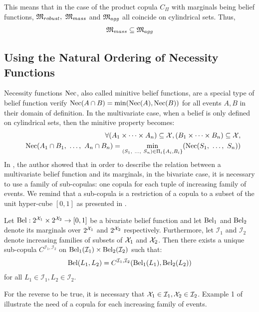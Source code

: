 This means that in the case of the product copula $C_\Pi$ with marginals being belief functions, $\mathfrak{M}_{robust},~\mathfrak{M}_{mass}$ and $\mathfrak{M}_{agg}$ all coincide on cylindrical sets. Thus,
\begin{eqnarray*}
    \mathfrak{M}_{mass}\subseteq\mathfrak{M}_{agg}
\end{eqnarray*}

\subsection{Using the Natural Ordering of Necessity Functions}\label{sec:necessity_functions}
Necessity functions $\mathrm{Nec}$, also called minitive belief functions, are a special type of belief function verify $\mathrm{Nec}(A\cap B) =\min(\mathrm{Nec}(A), \mathrm{Nec}(B))$ for all events $A, B$ in their domain of definition. In the multivariate case, when a belief is only defined on cylindrical sets, then the minitive property becomes:
\begin{eqnarray}
    &&\forall (A_1\times\dots\times A_n)\subseteq\mathcal{X}, (B_1\times\dots\times B_n)\subseteq\mathcal{X},\nonumber\\
    &&\mathrm{Nec}(A_1\cap B_1 , ~\dots, ~  A_n\cap B_n) = \min_{(S_1 , ~\dots, ~ S_n)\in\Pi_i\{A_i,B_i\}}(\mathrm{Nec}(S_1 , ~\dots, ~ S_n))
\end{eqnarray}
In \cite{schmelzer_joint_2015}, the author showed that in order to describe the relation between a multivariate belief function and its marginals, in the bivariate case, it is necessary to use a family of sub-copulas: one copula for each tuple of increasing family of events. We remind that a sub-copula is a restriction of a copula to a subset of the unit hyper-cube $[0,1]$ as presented in .

\begin{theorem}\label{theorem:sklar_belief}
    Let $\mathrm{Bel} :2^{\mathcal{X}_1}\times2^{\mathcal{X}_2}\rightarrow[0,1]$ be a bivariate belief function and let $\mathrm{Bel}_1$ and $\mathrm{Bel}_2$ denote its marginals over $2^{\mathcal{X}_1}$ and $2^{\mathcal{X}_2}$ respectively. Furthermore, let $\mathcal{I}_1$ and $\mathcal{I}_2$ denote increasing families of subsets of $\mathcal{X}_1$ and $\mathcal{X}_2$. Then there exists a unique sub-copula $C^{\mathcal{I}_1,\mathcal{I}_2}$ on  $\mathrm{Bel}_1(\mathcal{I}_1)\times \mathrm{Bel}_2(\mathcal{I}_2)$ such that:
    \begin{eqnarray}
        \mathrm{Bel} (L_1, L_2) = C^{\mathcal{I}_1,\mathcal{I}_2}(\mathrm{Bel}_1(L_1), \mathrm{Bel}_2(L_2))
    \end{eqnarray}
    for all $L_1\in\mathcal{I}_1,L_2\in\mathcal{I}_2$.
\end{theorem}
For the reverse to be true, it is necessary that $\mathcal{X}_1\in\mathcal{I}_1, \mathcal{X}_2\in\mathcal{I}_2$. Example 1 of \cite{schmelzer_joint_2015} illustrate the need of a copula for each increasing family of events.

